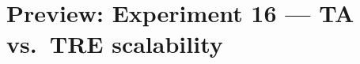 \documentclass[lettersize,journal]{IEEEtran}
\begin{document}
\section*{Preview: Experiment 16 --- TA vs.\ TRE scalability}


\end{document}
